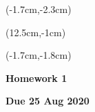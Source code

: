\documentclass[12pt, oneside]{article}
\begin{document}
\begin{textblock*}{4cm}(-1.7cm,-2.3cm)
\end{textblock*}

\begin{textblock*}{8cm}(12.5cm,-1cm)
\end{textblock*}
\begin{textblock*}{13.5cm}(-1.7cm,-1.8cm)
\end{textblock*}

\vspace{1cm}

\begin{center}
\textbf{\Large Homework 1}

\textbf{Due 25 Aug 2020}
\end{center}
\end{document}
